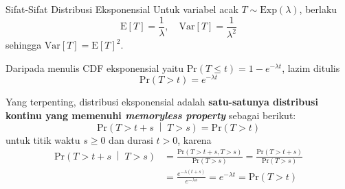 \documentclass{beamer}
\newcommand{\pars}[1]{\left(#1\right)}
\newcommand{\brackets}[1]{\left[#1\right]}
\newcommand{\braces}[1]{\left\{#1\right\}}
\begin{document}
\begin{frame}{Sifat-Sifat Distribusi Eksponensial}
    Untuk variabel acak \(T \sim \text{Exp}(\lambda)\), berlaku
    \[\text{E}\brackets{T} = \frac{1}{\lambda}, \quad \text{Var}\brackets{T} = \frac{1}{\lambda^2}\]
    sehingga \(\text{Var}\brackets{T} = \text{E}\brackets{T}^2\).

    Daripada menulis CDF eksponensial yaitu \(\text{Pr}(T \le t) = 1 - e^{-\lambda t}\), lazim ditulis
    \[\text{Pr}(T > t) = e^{-\lambda t}\]

    Yang terpenting, distribusi eksponensial adalah \textbf{satu-satunya distribusi kontinu yang memenuhi \textit{memoryless property}} sebagai berikut:
    \[\text{Pr}\pars{T > t+s \; \middle| \; T > s} = \text{Pr}\pars{T > t}\]
    untuk titik waktu \(s \ge 0\) dan durasi \(t > 0\), karena
    \begin{align*}
        \text{Pr}\pars{T > t+s \; \middle| \; T > s} &= \frac{\text{Pr}\pars{T>t+s, T>s}}{\text{Pr}\pars{T>s}} = \frac{\text{Pr}\pars{T>t+s}}{\text{Pr}\pars{T>s}} \\
        &= \frac{e^{-\lambda \pars{t+s}}}{e^{-\lambda s}} = e^{-\lambda t} = \text{Pr}\pars{T > t}
    \end{align*}
\end{frame}
\end{document}
